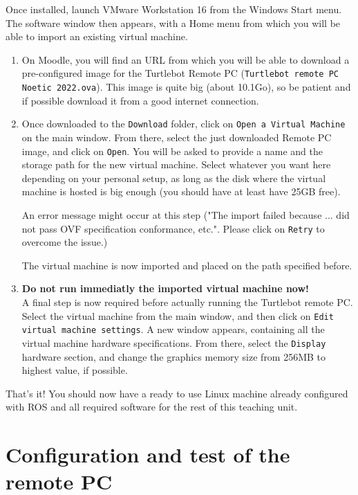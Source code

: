 \documentclass[10pt,a4paper,printanswers]{upmc}
\newcounter{mainmemorder}
\newcommand{\load}{\setcounter{enumi}{\value{mainmemorder}}}
\newcommand{\subsecline}{\texorpdfstring{\hrulefill}{}}
\begin{document}
Once installed, launch VMware  Workstation 16 from the Windows Start menu. The software window then
appears, with a Home menu from which you will be able to import an existing virtual machine.

\begin{enumerate}
  \load
  \item On Moodle, you will find an URL from which you will be able to download a pre-configured
        image for the Turtlebot Remote PC (\texttt{Turtlebot remote PC Noetic 2022.ova}). This
        image is quite big (about 10.1Go), so be patient and if possible download it from a good
        internet connection.
  \item Once downloaded to the \texttt{Download} folder, click on \texttt{Open a Virtual Machine} on
        the main window. From there, select the just downloaded Remote PC image, and click on
        \texttt{Open}. You will be asked to provide a name and the storage path for the new virtual
        machine. Select whatever you want here depending on your personal setup, as long as the disk
        where the virtual machine is hosted is big enough (you should have at least have 25GB free).
        \begin{mdframed}[style=graybox]
          An error message might occur at this step ("The import failed because ... did not
          pass OVF specification conformance, etc.". Please click on \texttt{Retry} to overcome the
          issue.)
        \end{mdframed}
        The virtual machine is now imported and placed on the path specified before.
  \item \textbf{Do not run immediatly the imported virtual machine now!}\\ A final step is now
        required before actually running the Turtlebot remote PC. Select the virtual machine from
        the main window, and then click on \texttt{Edit virtual machine settings}. A new window
        appears, containing all the virtual machine hardware specifications. From there, select the
        \texttt{Display} hardware section, and change the graphics memory size from 256MB to highest
        value, if possible.
\end{enumerate}

That's it! You should now have a ready to use Linux machine already configured with ROS and all
required software for the rest of this teaching unit.

\section{Configuration and test of the remote PC \subsecline}
\end{document}
